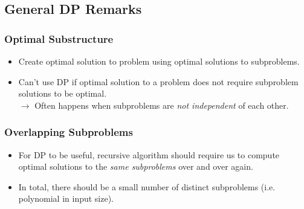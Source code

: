 \documentclass{article}
\begin{document}
\small

\setlength{\parindent}{0em}
\setlength{\itemindent}{0em}
\setlength{\leftmargini}{0em}

\begin{multicols*}{2}
    \subsection*{General DP Remarks}
    \subsubsection*{Optimal Substructure}
    \begin{itemize}
        \item Create optimal solution to problem using optimal solutions to
              subproblems.
        \item Can't use DP if optimal solution to a problem does not require
              subproblem solutions to be optimal. \\
              \(\rightarrow\) Often happens when subproblems are \emph{not
                  independent} of each other.
    \end{itemize}
    \subsubsection*{Overlapping Subproblems}
    \begin{itemize}
        \item For DP to be useful, recursive algorithm should require us to compute
              optimal solutions to the \emph{same subproblems} over and over again.
        \item In total, there should be a small number of distinct subproblems (i.e.
              polynomial in input size).
    \end{itemize}


\end{multicols*}
\end{document}
